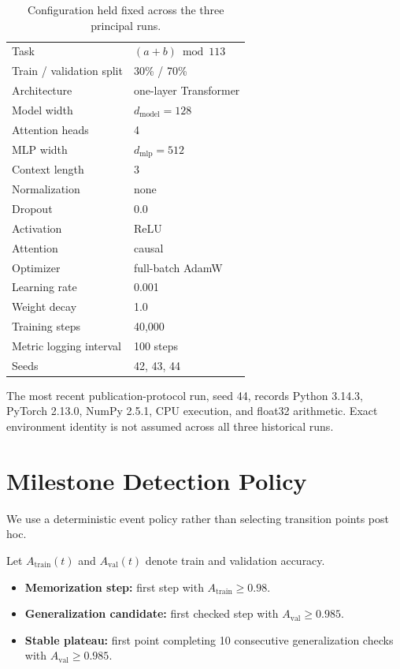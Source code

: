 \documentclass[11pt]{article}
\begin{document}
\begin{table}[h]
\centering
\caption{Configuration held fixed across the three principal runs.}
\label{tab:config}
\begin{tabular}{ll}
\toprule
Task & $(a+b)\bmod 113$ \\
Train / validation split & 30\% / 70\% \\
Architecture & one-layer Transformer \\
Model width & $d_{\mathrm{model}}=128$ \\
Attention heads & 4 \\
MLP width & $d_{\mathrm{mlp}}=512$ \\
Context length & 3 \\
Normalization & none \\
Dropout & 0.0 \\
Activation & ReLU \\
Attention & causal \\
Optimizer & full-batch AdamW \\
Learning rate & 0.001 \\
Weight decay & 1.0 \\
Training steps & 40{,}000 \\
Metric logging interval & 100 steps \\
Seeds & 42, 43, 44 \\
\bottomrule
\end{tabular}
\end{table}

The most recent publication-protocol run, seed 44, records Python 3.14.3, PyTorch 2.13.0, NumPy 2.5.1, CPU execution, and float32 arithmetic. Exact environment identity is not assumed across all three historical runs.

\section{Milestone Detection Policy}
We use a deterministic event policy rather than selecting transition points post hoc.

Let $A_{\mathrm{train}}(t)$ and $A_{\mathrm{val}}(t)$ denote train and validation accuracy.

\begin{itemize}[leftmargin=*]
    \item \textbf{Memorization step:} first step with $A_{\mathrm{train}}\ge 0.98$.
    \item \textbf{Generalization candidate:} first checked step with $A_{\mathrm{val}}\ge 0.985$.
    \item \textbf{Stable plateau:} first point completing 10 consecutive generalization checks with $A_{\mathrm{val}}\ge 0.985$.
\end{itemize}
\end{document}
